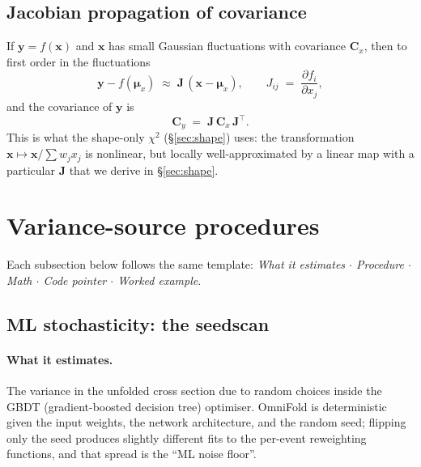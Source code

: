 \documentclass[12pt]{article}
\newcommand{\T}{^{\!\top}}
\begin{document}
\subsection{Jacobian propagation of covariance}
\label{sec:jacobian-prereq}

If $\mathbf{y} = f(\mathbf{x})$ and $\mathbf{x}$ has small Gaussian
fluctuations with covariance $\mathbf{C}_{x}$, then to first order in
the fluctuations
\begin{equation}
\mathbf{y} - f(\boldsymbol{\mu}_{x})
\;\approx\;
\mathbf{J}\,(\mathbf{x}-\boldsymbol{\mu}_{x}),
\qquad
J_{ij} \;=\; \frac{\partial f_{i}}{\partial x_{j}},
\end{equation}
and the covariance of $\mathbf{y}$ is
\begin{equation}
\boxed{\;\mathbf{C}_{y} \;=\; \mathbf{J}\,\mathbf{C}_{x}\,\mathbf{J}\T.\;}
\label{eq:jacprop}
\end{equation}
This is what the shape-only $\chi^{2}$ (\S\ref{sec:shape}) uses: the
transformation $\mathbf{x}\mapsto\mathbf{x}/\sum w_{j}x_{j}$ is
nonlinear, but locally well-approximated by a linear map with a
particular $\mathbf{J}$ that we derive in \S\ref{sec:shape}.

\section{Variance-source procedures}
\label{sec:variance}

Each subsection below follows the same template:
\emph{What it estimates $\cdot$ Procedure $\cdot$ Math $\cdot$ Code
pointer $\cdot$ Worked example}.

\subsection{ML stochasticity: the seedscan}
\label{sec:seedscan}

\paragraph{What it estimates.}
The variance in the unfolded cross section due to random choices
inside the GBDT (gradient-boosted decision tree) optimiser. OmniFold
is deterministic given the input weights, the network architecture,
and the random seed; flipping only the seed produces slightly
different fits to the per-event reweighting functions, and that
spread is the ``ML noise floor''.
\end{document}
